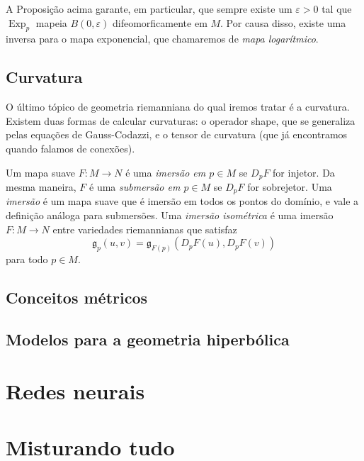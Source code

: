 \documentclass{article}
\DeclareMathOperator{\Exp}{Exp}
\begin{document}
A Proposição acima garante, em particular, que sempre existe um $\varepsilon > 0$ tal que $\Exp_p$ mapeia $B(0, \varepsilon)$ difeomorficamente em $M$. Por causa disso, existe uma inversa para o mapa exponencial, que chamaremos de \textit{mapa logarítmico}.

\subsection{Curvatura}

O último tópico de geometria riemanniana do qual iremos tratar é a curvatura. Existem duas formas de calcular curvaturas: o operador shape, que se generaliza pelas equações de Gauss-Codazzi, e o tensor de curvatura (que já encontramos quando falamos de conexões).

Um mapa suave $F \colon M \to N$ é uma \textit{imersão em $p \in M$} se $D_pF$ for injetor. Da mesma maneira, $F$ é uma \textit{submersão em $p \in M$} se $D_pF$ for sobrejetor. Uma \textit{imersão} é um mapa suave que é imersão em todos os pontos do domínio, e vale a definição análoga para submersões. Uma \textit{imersão isométrica} é uma imersão $F \colon M \to N$ entre variedades riemannianas que satisfaz \begin{equation}
    \mathfrak{g}_p(u, v) = \mathfrak{g}_{F(p)}(D_pF(u), D_pF(v))
\end{equation} para todo $p \in M$.

\subsection{Conceitos métricos}

\subsection{Modelos para a geometria hiperbólica}

\section{Redes neurais}

\section{Misturando tudo}

\nocite{*}
\printbibliography
\end{document}
